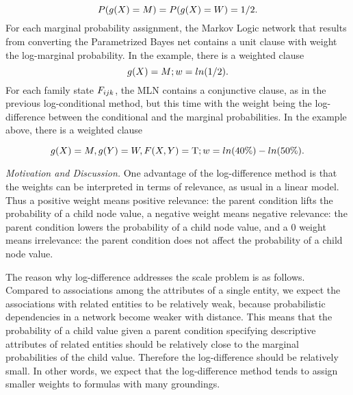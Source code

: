 \documentclass[twoside,leqno,twocolumn]{article}
\begin{document}
\[P(g(X) = M) = P(g(X) = W) = 1/2.\] 
%
For each marginal probability assignment, the Markov Logic network that results from converting the Parametrized Bayes net contains a unit clause with weight the log-marginal probability. In the example, there is a weighted clause \[g(X) = M; w = ln(1/2). \]
For each family state $F_{ijk}$, the MLN contains a conjunctive clause, as in the previous log-conditional method, but this time with the weight being the log-difference between the conditional and the marginal probabilities. In the example above, there is a weighted clause 

\begin{small}
\[g(X)= M, g(Y) = W, F(X,Y) = \mathrm{T}; w = ln(40\%) - ln(50\%).\]
\end{small}
{\em Motivation and Discussion.} One advantage of the log-difference method is that the weights can be interpreted in terms of relevance, as usual in a linear model. Thus a positive weight means positive relevance: the parent condition lifts the probability of a child node value, a negative weight means negative relevance: the parent condition lowers the probability of a child node value, and a 0 weight means irrelevance: the parent condition does not affect the probability of a child node value.

The reason why log-difference addresses the scale problem is as follows.
Compared to associations among the attributes of a single entity, we expect the associations with related entities to be relatively weak, because probabilistic dependencies in a network become weaker with distance. This means that the probability of a child value given a parent condition specifying descriptive attributes of related entities should be relatively close to the marginal probabilities of the child value. Therefore the log-difference should be relatively small. In other words, we expect that the log-difference method tends to assign smaller weights to formulas with many groundings.
\end{document}
